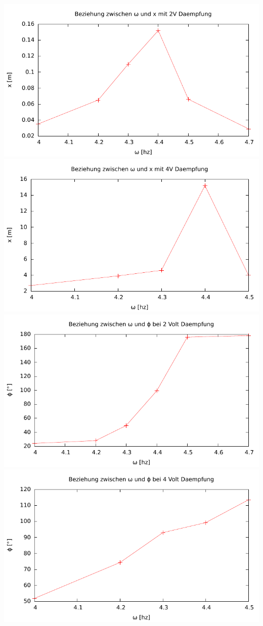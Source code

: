 \documentclass{scrartcl}
\begin{document}
\includegraphics{PhyPr_Dreh_2_2_1.pdf}\\
\includegraphics{PhyPr_Dreh_2_2_1_2.pdf}\\
\includegraphics{PhyPr_Dreh_2_2_1_3.pdf}\\
\includegraphics{PhyPr_Dreh_2_2_1_4.pdf}\\
\end{document}
